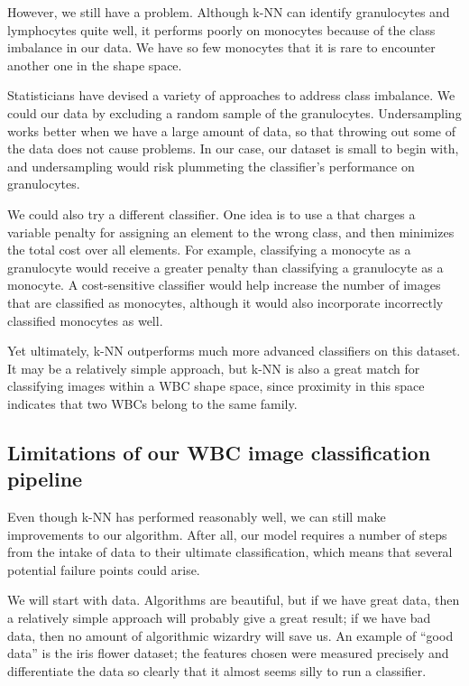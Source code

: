 However, we still have a problem. Although k-NN can identify granulocytes and lymphocytes quite well, it performs poorly on monocytes because of the class imbalance in our data. We have so few monocytes that it is rare to encounter another one in the shape space.

Statisticians have devised a variety of approaches to address class imbalance. We could  our data by excluding a random sample of the granulocytes. Undersampling works better when we have a large amount of data, so that throwing out some of the data does not cause problems. In our case, our dataset is small to begin with, and undersampling would risk plummeting the classifier's performance on granulocytes.

We could also try a different classifier. One idea is to use a  that charges a variable penalty for assigning an element to the wrong class, and then minimizes the total cost over all elements. For example, classifying a monocyte as a granulocyte would receive a greater penalty than classifying a granulocyte as a monocyte. A cost-sensitive classifier would help increase the number of images that are classified as monocytes, although it would also incorporate incorrectly classified monocytes as well.

Yet ultimately, k-NN outperforms much more advanced classifiers on this dataset. It may be a relatively simple approach, but k-NN is also a great match for classifying images within a WBC shape space, since proximity in this space indicates that two WBCs belong to the same family.

\FloatBarrier
{}
\subsection{Limitations of our WBC image classification pipeline}

Even though k-NN has performed reasonably well, we can still make improvements to our algorithm. After all, our model requires a number of steps from the intake of data to their ultimate classification, which means that several potential failure points could arise.

We will start with data. Algorithms are beautiful, but if we have great data, then a relatively simple approach will probably give a great result; if we have bad data, then no amount of algorithmic wizardry will save us. An example of ``good data'' is the iris flower dataset; the features chosen were measured precisely and differentiate the data so clearly that it almost seems silly to run a classifier.

